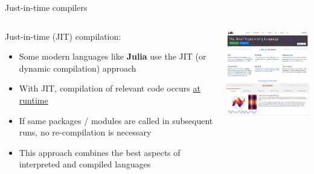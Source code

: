 \begin{frame}{\insertsectionnumber{ |} Just-in-time compilers}


\begin{columns}

\column[c]{4cm}

\begin{beamerboxesrounded}[lower=gray,shadow=true]{

Just-in-time (JIT) compilation: \\

\begin{itemize}

\item Some modern languages like \textbf{Julia} use the JIT (or dynamic compilation) approach
\item With JIT, compilation of relevant code occurs \underline{at runtime}
\item If same packages / modules are called in subsequent runs, no re-compilation is necessary
\item This approach combines the best aspects of interpreted and compiled languages
\end{itemize}
}
\end{beamerboxesrounded}


\column[c]{6cm}

\includegraphics[width=6cm]{images/julia_web.png}

\end{columns}

\end{frame}





